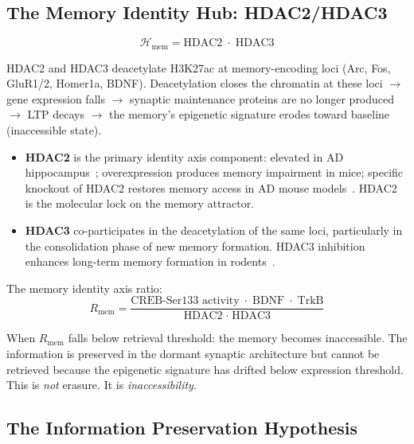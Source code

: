 \documentclass[12pt,a4paper]{article}
\newcommand{\RMEM}{R_{\mathrm{mem}}}
\newcommand{\Hub}{\mathcal{H}}
\begin{document}
\subsection{The Memory Identity Hub: HDAC2/HDAC3}

\begin{equation}
  \Hub_{\mathrm{mem}} = \text{HDAC2} \;\cdot\; \text{HDAC3}
  \label{eq:hub_mem}
\end{equation}

HDAC2 and HDAC3 deacetylate H3K27ac at memory-encoding
loci (Arc, Fos, GluR1/2, Homer1a, BDNF). Deacetylation
closes the chromatin at these loci $\to$ gene expression
falls $\to$ synaptic maintenance proteins are no longer
produced $\to$ LTP decays $\to$ the memory's epigenetic
signature erodes toward baseline (inaccessible state).

\begin{itemize}
  \item \textbf{HDAC2} is the primary identity axis
    component: elevated in AD hippocampus~\cite{Ganai2016};
    overexpression produces memory impairment in mice;
    specific knockout of HDAC2 restores memory access
    in AD mouse models~\cite{Guan2009}. HDAC2 is the
    molecular lock on the memory attractor.
  \item \textbf{HDAC3} co-participates in the
    deacetylation of the same loci, particularly in
    the consolidation phase of new memory formation.
    HDAC3 inhibition enhances long-term memory
    formation in rodents~\cite{McQuown2011}.
\end{itemize}

The memory identity axis ratio:
\begin{equation}
  \RMEM = \frac{\text{CREB-Ser133 activity} \;\cdot\;
                \text{BDNF}\;\cdot\;\text{TrkB}}
               {\text{HDAC2} \;\cdot\; \text{HDAC3}}
  \label{eq:RMEM}
\end{equation}

When $\RMEM$ falls below retrieval threshold: the memory
becomes inaccessible. The information is preserved in
the dormant synaptic architecture but cannot be retrieved
because the epigenetic signature has drifted below
expression threshold. This is \emph{not} erasure.
It is \emph{inaccessibility}.

\subsection{The Information Preservation Hypothesis}
\end{document}
